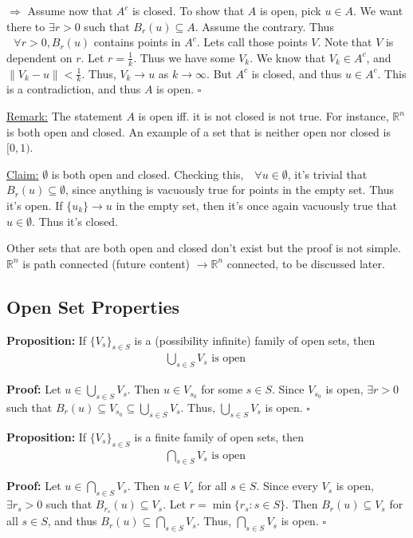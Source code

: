 \documentclass{article}
\newcommand*{\qed}{\hfill$\square$}%
\newcommand*{\txt}[1]{\text{ #1 }}%
\newcommand*{\fora}{\txt{}\forall}%
\newcommand*{\rr}{\mathbb{R}}%
\begin{document}
$\Rightarrow$ Assume now that $A^c$ is closed. To show that $A$ is open, pick $u\in A$. We want there to $\exists r>0$ such that $B_r(u)\subseteq A$. Assume the contrary. Thus $\fora r>0, B_r(u)$ contains points in $A^c$. Lets call those points $V$. Note that $V$ is dependent on $r$. Let $r=\frac{1}{k}$. Thus we have some $V_k$. We know that $V_k\in A^c$, and $\|V_k-u\|<\frac{1}{k}$. Thus, $V_k\to u$ as $k\to\infty$. But $A^c$ is closed, and thus $u\in A^c$. This is a contradiction, and thus $A$ is open. \qed

\underline{Remark:} The statement $A$ is open iff. it is not closed is not true. For instance, $\rr^n$ is both open and closed. An example of a set that is neither open nor closed is $[0,1)$.

\underline{Claim:} $\emptyset$ is both open and closed. Checking this, $\fora u\in \emptyset$, it's trivial that $B_r(u)\subseteq \emptyset$, since anything is vacuously true for points in the empty set. Thus it's open. If $\{u_k\}\to u$ in the empty set, then it's once again vacuously true that $u\in \emptyset$. Thus it's closed. 

Other sets that are both open and closed don't exist but the proof is not simple. $\rr^n$ is path connected (future content) $\rightarrow \rr^n$ connected, to be discussed later.

\subsection{Open Set Properties}

\textbf{Proposition:} If $\{V_s\}_{s\in S}$ is a (possibility infinite) family of open sets, then \begin{align*}
    \bigcup_{s\in S}V_s\txt{ is open}
\end{align*}

\textbf{Proof:} Let $u\in \bigcup_{s\in S}V_s$. Then $u\in V_{s_0}$ for some $s\in S$. Since $V_{s_0}$ is open, $\exists r>0$ such that $B_r(u)\subseteq V_{s_0}\subseteq\bigcup_{s\in S}V_s$. Thus, $\bigcup_{s\in S}V_s$ is open. \qed

\textbf{Proposition:} If $\{V_s\}_{s\in S}$ is a finite family of open sets, then \begin{align*}
    \bigcap_{s\in S}V_s\txt{ is open}
\end{align*}

\textbf{Proof:} Let $u\in \bigcap_{s\in S}V_s$. Then $u\in V_s$ for all $s\in S$. Since every $V_s$ is open, $\exists r_s>0$ such that $B_{r_s}(u)\subseteq V_s$. Let $r=\min\{r_s:s\in S\}$. Then $B_r(u)\subseteq V_s$ for all $s\in S$, and thus $B_r(u)\subseteq \bigcap_{s\in S}V_s$. Thus, $\bigcap_{s\in S}V_s$ is open. \qed
\end{document}
